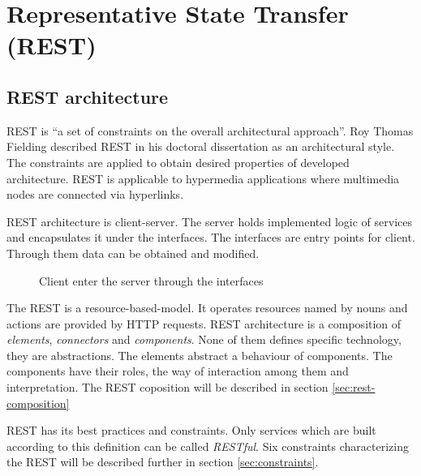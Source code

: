 \chapter{Representative State Transfer (REST)}
\label{chap:rest}


\section{REST architecture}
\label{sec:rest-architecture}

REST is ``a set of constraints on the overall architectural approach''\cite{agile-architecture}. Roy Thomas Fielding described REST in his doctoral dissertation as an architectural style. The constraints are applied to obtain desired properties of developed architecture. REST is applicable to \gls{hypermedia} applications where multimedia nodes are connected via hyperlinks.

REST architecture is client-server. The server holds implemented logic of services and encapsulates it under the interfaces. The interfaces are entry points for client. Through them data can be obtained and modified. 

\begin{figure}[htp] 
\caption{Client enter the server through the interfaces}
\label{fig:communication-through-interface}
\end{figure} 


The REST is a \gls{resource-based-model}. It operates resources named by nouns and actions are provided by HTTP requests. REST architecture is a composition of \emph{elements}, \emph{connectors} and \emph{components}. None of them defines specific technology, they are abstractions. The elements abstract a behaviour of components. The components have their roles, the way of interaction among them and interpretation. The REST coposition will be described in section \ref{sec:rest-composition}

REST has its best practices and constraints. Only services which are built according to this definition can be called \emph{RESTful}. Six constraints characterizing the REST will be described further in section \ref{sec:constraints}.

